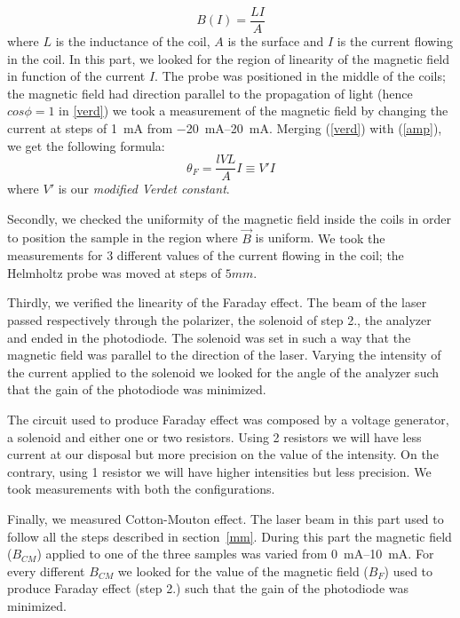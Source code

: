 \documentclass[11pt,a4paper]{article}
\begin{document}
\begin{equation}
B(I)=\frac{LI}{A}\label{amp}
\end{equation}
where $L$ is the inductance of the coil, $A$ is the surface and $I$ is the current flowing in the coil. In this part, we looked for the region of linearity of the magnetic field in function of the current $I$. The probe was positioned in the middle of the coils; {\color{red}the magnetic field had direction parallel to the propagation of light} (hence $cos\phi=1$ in \ref{verd}) we took a measurement of the magnetic field by changing the current at steps of \SI{1}{\mA} from \SIrange{-20}{+20}{\mA}. Merging (\ref{verd}) with (\ref{amp}), we get the following formula:
\begin{equation}
\theta_F=\frac{lVL}{A}I\equiv V'I\label{modverd}
\end{equation} where $V'$ is our \emph{modified Verdet constant}.

Secondly, we checked the uniformity of the magnetic field inside the coils in order to position the sample in the region where $\vec{B}$ is uniform. {\color{red}We took the measurements for 3 different values of the current flowing in the coil; the Helmholtz probe was moved at steps of $5mm$.}

Thirdly, we verified the linearity of the Faraday effect. The beam of the laser passed respectively through the polarizer, the solenoid of step 2., the analyzer and ended in the photodiode. The solenoid was set in such a way that the magnetic field was parallel to the direction of the laser. Varying the intensity of the current applied to the solenoid we looked for the angle of the analyzer such that the gain of the photodiode was minimized.

The circuit used to produce Faraday effect was composed by a voltage generator, a solenoid and either one or two resistors. {\color{red}Using 2 resistors we will have less current at our disposal but more precision on the value of the intensity}. On the contrary, using 1 resistor we will have higher intensities but less precision. We took measurements with both the configurations.

Finally, we measured Cotton-Mouton effect. The laser beam in this part used to follow all the steps described in section~\ref{mm}. During this part the magnetic field ($B_{CM}$) applied to one of the three samples was varied from \SIrange{0}{10}{\mA}. For every different $B_{CM}$ we looked for the value of the magnetic field ($B_F$) used to produce Faraday effect (step 2.) such that the gain of the photodiode was minimized.
\end{document}
